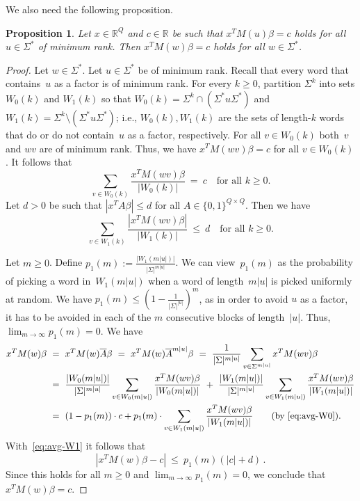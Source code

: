\documentclass[11pt,a4paper]{amsart}
\theoremstyle{plain}
\newtheorem{prop}[thm]{Proposition}
\theoremstyle{definition}
\theoremstyle{defC}
\theoremstyle{thmC}
\theoremstyle{plain}
\numberwithin{equation}{section}
\begin{document}
\noindent
We also need the following proposition.

\begin{prop}\label{prop:compact}
Let $x \in \mathbb{R}^{Q}$ and $c \in \mathbb{R}$ be such that $x^T M(u) \beta = c$ holds for all $u \in \Sigma^*$ of minimum rank.
Then $x^T M(w) \beta = c$ holds for all $w \in \Sigma^*$.
\end{prop}

\begin{proof}
Let $w \in \Sigma^*$.
Let $u \in \Sigma^*$ be of minimum rank.
Recall that every word that contains~$u$ as a factor is of minimum rank.
For every $k \ge 0$, partition $\Sigma^k$ into sets $W_0(k)$ and $W_1(k)$ so that $W_0(k) = \Sigma^k \cap (\Sigma^* u \Sigma^*)$ and $W_1(k) = \Sigma^k \setminus (\Sigma^* u \Sigma^*)$; i.e., $W_0(k), W_1(k)$ are the sets of length-$k$ words that do or do not contain~$u$ as a factor, respectively.
For all $v \in W_0(k)$ both~$v$ and $w v$ are of minimum rank.
Thus, we have $x^T M(w v) \beta = c$ for all $v \in W_0(k)$.
It follows that
\begin{equation} \label{eq:avg-W0}
\sum_{v \in W_0(k)} \frac{x^T M(w v) \beta}{|W_0(k)|} \ = \ c \quad \text{for all $k \ge 0$.} 
\end{equation}
Let $d > 0$ be such that $|x^T A \beta| \le d$ for all $A \in \{0,1\}^{Q \times Q}$.
Then we have
\begin{equation} \label{eq:avg-W1}
\sum_{v \in W_1(k)} \frac{|x^T M(w v) \beta|}{|W_1(k)|} \ \le \ d \quad \text{for all $k \ge 0$.} 
\end{equation}

\noindent
Let $m \ge 0$.
Define $p_1(m) := \frac{|W_1(m |u|)|}{|\Sigma|^{m |u|}}$.
We can view~$p_1(m)$ as the probability of picking a word in~$W_1(m |u|)$ when a word of length~$m |u|$ is picked uniformly at random.
We have
$p_1(m) \le \left( 1 - \frac{1}{|\Sigma|^{|u|}} \right)^m$, as in order to avoid $u$ as a factor, it has to be avoided in each of the $m$ consecutive blocks of length~$|u|$.
Thus, $\lim_{m \to \infty} p_1(m) = 0$.
We have
\begin{align*}
x^T M(w) \beta
 \ &= \ x^T M(w) \overline{A} \beta \ = \ x^T M(w) \overline{A}^{m |u|} \beta \ = \ \frac{1}{|\Sigma|^{m |u|}} \sum_{v \in \Sigma^{m |u|}} x^T M(w v) \beta \\
 \ &= \ \frac{|W_0(m |u|)|}{|\Sigma|^{m |u|}} \sum_{v \in W_0(m |u|)} \frac{x^T M(w v) \beta}{|W_0(m |u|)|} \ + \ \frac{|W_1(m |u|)|}{|\Sigma|^{m |u|}} \sum_{v \in W_1(m |u|)} \frac{x^T M(w v) \beta}{|W_1(m |u|)|} \\
 \ &= \ (1-p_1(m)) \cdot c + p_1(m) \cdot \sum_{v \in W_1(m |u|)} \frac{x^T M(w v) \beta}{|W_1(m |u|)|} \qquad (\text{by \autoref{eq:avg-W0}).}
\end{align*}
With~\autoref{eq:avg-W1} it follows that
\[
 |x^T M(w) \beta - c| \ \le \ p_1(m) ( |c| + d)\,.
\]
Since this holds for all $m \ge 0$ and $\lim_{m \to \infty} p_1(m) = 0$, we conclude that $x^T M(w) \beta = c$.
\end{proof}
\end{document}
